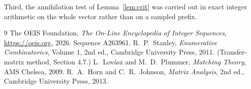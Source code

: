 \documentclass[11pt,a4paper]{article}
\theoremstyle{plain}
\theoremstyle{definition}
\begin{document}
Third, the annihilation test of Lemma~\ref{lem:crit} was carried out in exact integer
arithmetic on the whole vector rather than on a sampled prefix.

\begin{thebibliography}{9}
 The OEIS Foundation, \emph{The On-Line Encyclopedia of Integer
Sequences}, \url{https://oeis.org}, 2026. Sequence A263961.
 R.~P.~Stanley, \emph{Enumerative Combinatorics}, Volume 1, 2nd ed.,
Cambridge University Press, 2011. (Transfer-matrix method, Section 4.7.)
 L.~Lov\'asz and M.~D.~Plummer, \emph{Matching Theory}, AMS Chelsea, 2009.
 R.~A.~Horn and C.~R.~Johnson, \emph{Matrix Analysis}, 2nd ed., Cambridge
University Press, 2013.
\end{thebibliography}
\end{document}
